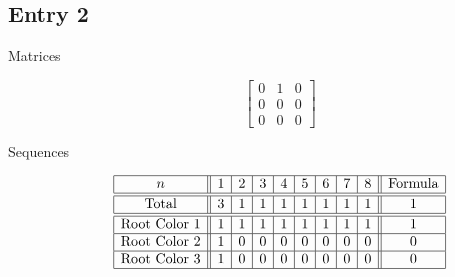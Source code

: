 \documentclass[12pt]{amsart}
\begin{document}
\subsection*{Entry 2}
\begin{description}
    \item[Matrices]
    
    \[\begin{bmatrix}
0 & 1 & 0 \\
0 & 0 & 0 \\
0 & 0 & 0
\end{bmatrix}\]
    \item[Sequences]\hspace*{\fill}\vspace{-0.5cm}
    \begin{center}
        \[
        \begin{array}{|c||c|c|c|c|c|c|c|c||c|}\hline
           n  & 1 & 2 & 3 & 4 & 5 & 6 & 7 & 8  & \text{Formula}\\\hline\hline
           \text{Total}  & 3 & 1 & 1 & 1 & 1 & 1 & 1 & 1 & 1\\\hline\hline
           \text{Root Color }1 & 1 & 1 & 1 & 1 & 1 & 1 & 1 & 1 & 1\\\hline
           \text{Root Color }2 & 1 & 0 & 0 & 0 & 0 & 0 & 0 & 0 & 0\\\hline
           \text{Root Color }3 & 1 & 0 & 0 & 0 & 0 & 0 & 0 & 0 & 0\\\hline
        \end{array}
        \]
    \end{center}
    
\end{description}
\end{document}
